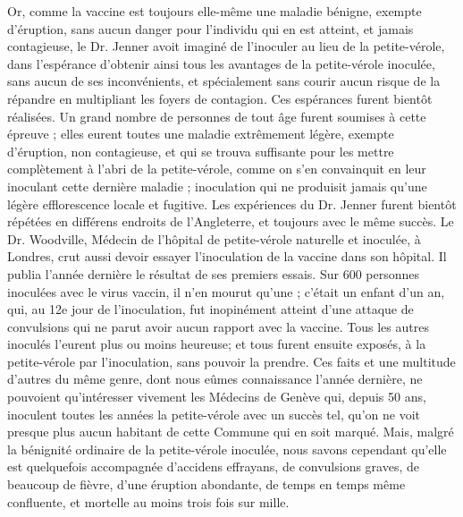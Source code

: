 Or, comme la vaccine est toujours elle-même une maladie bénigne, exempte d'éruption, sans aucun danger pour l'individu qui en est atteint, et jamais contagieuse, le Dr. Jenner avoit imaginé de l'inoculer au lieu de\setcounter{page}{73} la petite-vérole, dans l'espérance d'obtenir ainsi tous les avantages de la petite-vérole inoculée, sans aucun de ses inconvénients, et spécialement sans courir aucun risque de la répandre en multipliant les foyers de contagion. Ces espérances furent bientôt réalisées. Un grand nombre de personnes de tout âge furent soumises à cette épreuve ; elles eurent toutes une maladie extrêmement légère, exempte d'éruption, non contagieuse, et qui se trouva suffisante pour les mettre complètement à l'abri de la petite-vérole, comme on s'en convainquit en leur inoculant cette dernière maladie ; inoculation qui ne produisit jamais qu'une légère efflorescence locale et fugitive.
Les expériences du Dr. Jenner furent bientôt répétées en différens endroits de l'Angleterre, et toujours avec le même succès. Le Dr. Woodville, Médecin de l'hôpital de petite-vérole naturelle et inoculée, à Londres, crut aussi devoir essayer l'inoculation de la vaccine dans son hôpital. Il publia l'année dernière le résultat de ses premiers essais. Sur 600 personnes inoculées avec le virus vaccin, il n'en mourut qu'une ; c'était un enfant d'un an, qui, au 12e jour de l'inoculation, fut inopinément atteint d'une attaque de convulsions qui ne parut avoir aucun\setcounter{page}{74} rapport avec la vaccine. Tous les autres inoculés l'eurent plus ou moins heureuse; et tous furent ensuite exposés, à la petite-vérole par l'inoculation, sans pouvoir la prendre.
Ces faits et une multitude d'autres du même genre, dont nous eûmes connaissance l'année dernière, ne pouvoient qu'intéresser vivement les Médecins de Genève qui, depuis 50 ans, inoculent toutes les années la petite-vérole avec un succès tel, qu'on ne voit presque plus aucun habitant de cette Commune qui en soit marqué. Mais, malgré la bénignité ordinaire de la petite-vérole inoculée, nous savons cependant qu'elle est quelquefois accompagnée d'accidens effrayans, de convulsions graves, de beaucoup de fièvre, d'une éruption abondante, de temps en temps même confluente, et mortelle au moins trois fois sur mille.
